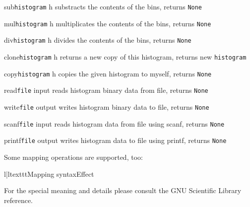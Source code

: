 \begin{methoddesc}{sub}{\texttt{histogram} h}
substracts the contents of the bins, \hfill returns \texttt{None}
\end{methoddesc}
\begin{methoddesc}{mul}{\texttt{histogram} h}
multiplicates the contents of the bins, \hfill returns \texttt{None}
\end{methoddesc}
\begin{methoddesc}{div}{\texttt{histogram} h}
divides the contents of the bins, \hfill returns \texttt{None}
\end{methoddesc}
\begin{methoddesc}{clone}{\texttt{histogram} h}
returns a new copy of this histogram, \hfill returns new \texttt{histogram}
\end{methoddesc}
\begin{methoddesc}{copy}{\texttt{histogram} h}
copies the given histogram to myself, \hfill returns \texttt{None}
\end{methoddesc}
\begin{methoddesc}{read}{\texttt{file} input}
reads histogram binary data from file, \hfill returns \texttt{None}
\end{methoddesc}
\begin{methoddesc}{write}{\texttt{file} output}
writes histogram binary data to file, \hfill returns \texttt{None}
\end{methoddesc}
\begin{methoddesc}{scanf}{\texttt{file} input}
reads histogram data from file using scanf, \hfill returns \texttt{None}
\end{methoddesc}
\begin{methoddesc}{printf}{\texttt{file} output}
writes histogram data to file using printf, \hfill returns \texttt{None}
\end{methoddesc}


Some mapping operations are supported, too:\nopagebreak
\begin{tableii}{l|l}{texttt}{Mapping syntax}{Effect}
\end{tableii}

\begin{seealso}
For the special meaning and details please consult the GNU Scientific Library
reference.
\end{seealso}


